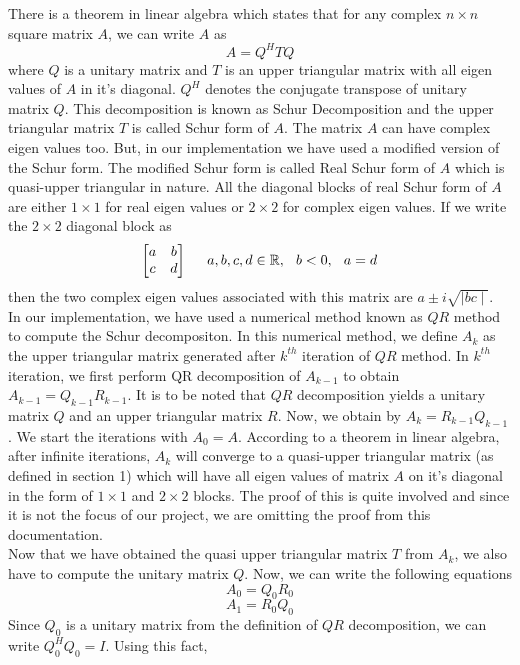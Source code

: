 \documentclass[12pt,a4paper]{article}
\begin{document}
There is a theorem in linear algebra which states that for any complex $n \times n$ square matrix $A$, we can write $A$ as
$$A = Q^{H}TQ$$
where $Q$ is a unitary matrix and $T$ is an upper triangular matrix with all eigen values of $A$ in it's diagonal. $Q^{H}$ denotes the conjugate transpose of unitary matrix $Q$. This decomposition is known as Schur Decomposition and the upper triangular matrix $T$ is called Schur form of $A$. The matrix $A$ can have complex eigen values too. But, in our implementation we have used a modified version of the Schur form. The modified Schur form is called Real Schur form of $A$ which is quasi-upper triangular in nature. All the diagonal blocks of real Schur form of $A$ are either $1 \times 1$ for real eigen values or $2 \times 2$ for complex eigen values. If we write the $2 \times 2$ diagonal block as 
$$\begin{bmatrix}a & b \\ c & d \end{bmatrix} \hspace{0.5cm}  a, b, c, d \in \mathbb{R},\hspace{0.25cm} b < 0, \hspace{0.25cm} a = d$$
then the two complex eigen values associated with this matrix are $a \pm i\sqrt{\mid bc \mid}$. \\ In our implementation, we have used a numerical method known as $QR$ method to compute the Schur decompositon. In this numerical method, we define $A_{k}$ as the upper triangular matrix generated after $k^{th}$ iteration of $QR$ method. In $k^{th}$ iteration, we first perform QR decomposition of $A_{k-1}$ to obtain $A_{k-1} = Q_{k-1}R_{k-1}$. It is to be noted that $QR$ decomposition yields a unitary matrix $Q$ and an upper triangular matrix $R$. Now, we obtain by $A_{k} = R_{k-1}Q_{k-1}$. We start the iterations with $A_{0} = A$. According to a theorem in linear algebra, after infinite iterations, $A_{k}$ will converge to a quasi-upper triangular matrix (as defined in section 1) which will have all eigen values of matrix $A$ on it's diagonal in the form of $1 \times 1$ and $2 \times 2$ blocks. The proof of this is quite involved and since it is not the focus of our project, we are omitting the proof from this documentation. \\ Now that we have obtained the quasi upper triangular matrix $T$ from $A_{k}$, we also have to compute the unitary matrix $Q$. Now, we can write the following equations
$$A_{0} = Q_{0}R_{0}$$
$$A_{1} = R_{0}Q_{0}$$
Since $Q_{0}$ is a unitary matrix from the definition of $QR$ decomposition, we can write $Q_{0}^{H}Q_{0} = I$. Using this fact,
\end{document}
